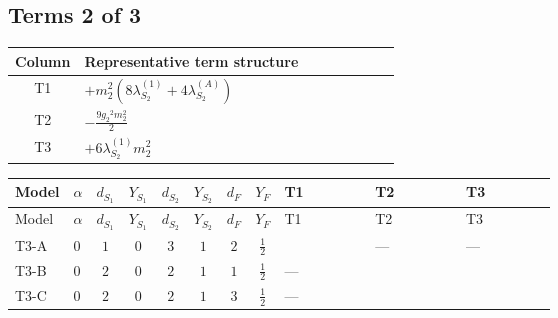 \documentclass[8pt]{article}
\begin{document}
\begin{landscape}
\subsection*{Terms 2 of 3}
\begin{center}
\begin{tabular}{@{}c >{\raggedright\arraybackslash}p{0.82\linewidth}@{}}
\toprule
Column & Representative term structure \\
\midrule
T1 & \(\displaystyle +{m_2^2} (8 {\lambda_{S_2}^{(1)}}+4 {\lambda_{S_2}^{(A)}})\) \\
\midrule
T2 & \(\displaystyle -\frac{9 {g_2}^2 {m_2^2}}{2}\) \\
\midrule
T3 & \(\displaystyle +6 {\lambda_{S_2}^{(1)}} {m_2^2}\) \\
\midrule
\bottomrule
\end{tabular}
\end{center}
\smallskip
\tiny
\begin{longtable}{@{}llcccccc >{\raggedright\arraybackslash}p{0.21\linewidth} >{\raggedright\arraybackslash}p{0.21\linewidth} >{\raggedright\arraybackslash}p{0.21\linewidth}@{}}
\toprule
Model & $\alpha$ & $d_{S_1}$ & $Y_{S_1}$ & $d_{S_2}$ & $Y_{S_2}$ & $d_F$ & $Y_F$ & T1 & T2 & T3 \\
\midrule
\endfirsthead
\toprule
Model & $\alpha$ & $d_{S_1}$ & $Y_{S_1}$ & $d_{S_2}$ & $Y_{S_2}$ & $d_F$ & $Y_F$ & T1 & T2 & T3 \\
\midrule
\endhead
T3-A & $0$ & $1$ & $0$ & $3$ & $1$ & $2$ & $\frac{1}{2}$ & \scriptsize\adjustbox{max width=\linewidth}{$\begin{gathered} +{m_2^2} (8 {\lambda_{S_2}^{(1)}}+4 {\lambda_{S_2}^{(A)}})\end{gathered}$} & --- & --- \\
\midrule
T3-B & $0$ & $2$ & $0$ & $2$ & $1$ & $1$ & $\frac{1}{2}$ & --- & \scriptsize\adjustbox{max width=\linewidth}{$\begin{gathered} -\frac{9 {g_2}^2 {m_2^2}}{2}\end{gathered}$} & \scriptsize\adjustbox{max width=\linewidth}{$\begin{gathered} +6 {\lambda_{S_2}^{(1)}} {m_2^2}\end{gathered}$} \\
\midrule
T3-C & $0$ & $2$ & $0$ & $2$ & $1$ & $3$ & $\frac{1}{2}$ & --- & \scriptsize\adjustbox{max width=\linewidth}{$\begin{gathered} -\frac{9 {g_2}^2 {m_2^2}}{2}\end{gathered}$} & \scriptsize\adjustbox{max width=\linewidth}{$\begin{gathered} +6 {\lambda_{S_2}^{(1)}} {m_2^2}\end{gathered}$} \\

\end{longtable}
\end{landscape}
\end{document}
